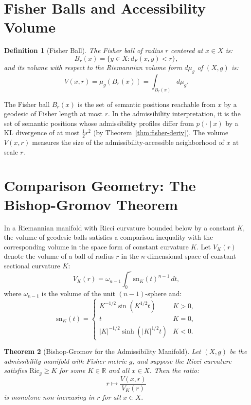 \documentclass[12pt, oneside]{book}
\theoremstyle{plain-flyxion}
\newtheorem{theorem}{Theorem}[chapter]
\theoremstyle{definition-flyxion}
\newtheorem{definition}[theorem]{Definition}
\begin{document}
\section{Fisher Balls and Accessibility Volume}

\begin{definition}[Fisher Ball]\label{def:fisher-ball}
The Fisher ball of radius $r$ centered at $x \in X$ is:
\begin{equation}\label{eq:fisher-ball}
B_r(x) = \{y \in X : d_F(x, y) < r\},
\end{equation}
and its volume with respect to the Riemannian volume form $d\mu_g$ of $(X,g)$ is:
\begin{equation}\label{eq:vol-def}
V(x, r) = \mu_g(B_r(x)) = \int_{B_r(x)} d\mu_g.
\end{equation}
\end{definition}

The Fisher ball $B_r(x)$ is the set of semantic positions reachable from $x$ by a
geodesic of Fisher length at most $r$. In the admissibility interpretation, it is the
set of semantic positions whose admissibility profiles differ from $p(\cdot\mid x)$ by
a KL divergence of at most $\frac{1}{2}r^2$ (by Theorem~\ref{thm:fisher-deriv}). The
volume $V(x,r)$ measures the size of the admissibility-accessible neighborhood of $x$
at scale $r$.

\section{Comparison Geometry: The Bishop-Gromov Theorem}

In a Riemannian manifold with Ricci curvature bounded below by a constant $K$, the
volume of geodesic balls satisfies a comparison inequality with the corresponding volume
in the space form of constant curvature $K$. Let $V_K(r)$ denote the volume of a ball
of radius $r$ in the $n$-dimensional space of constant sectional curvature $K$:
\[
V_K(r) = \omega_{n-1} \int_0^r \mathrm{sn}_K(t)^{n-1}\, dt,
\]
where $\omega_{n-1}$ is the volume of the unit $(n-1)$-sphere and:
\[
\mathrm{sn}_K(t) = \begin{cases}
  K^{-1/2}\sin(K^{1/2}t) & K > 0, \\
  t & K = 0, \\
  |K|^{-1/2}\sinh(|K|^{1/2}t) & K < 0.
\end{cases}
\]

\begin{theorem}[Bishop-Gromov for the Admissibility Manifold]\label{thm:bishop-gromov}
Let $(X, g)$ be the admissibility manifold with Fisher metric $g$, and suppose the
Ricci curvature satisfies $\mathrm{Ric}_g \geq K$ for some $K \in \mathbb{R}$ and all
$x \in X$. Then the ratio:
\begin{equation}\label{eq:bg-ratio}
r \mapsto \frac{V(x, r)}{V_K(r)}
\end{equation}
is monotone non-increasing in $r$ for all $x \in X$.
\end{theorem}
\end{document}
